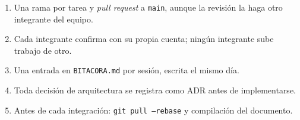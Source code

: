 \begin{enumerate}
\item Una rama por tarea y \emph{pull request} a \texttt{main}, aunque la revisión la haga otro
integrante del equipo.
\item Cada integrante confirma con su propia cuenta; ningún integrante sube trabajo de otro.
\item Una entrada en \texttt{BITACORA.md} por sesión, escrita el mismo día.
\item Toda decisión de arquitectura se registra como ADR antes de implementarse.
\item Antes de cada integración: \texttt{git pull --rebase} y compilación del documento.
\end{enumerate}
